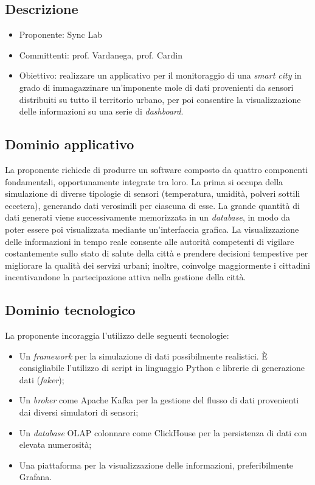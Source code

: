 \documentclass[8pt]{article}
\begin{document}
\subsection{Descrizione}
\begin{itemize}
	\setlength\itemsep{0em}
	\item Proponente: Sync Lab
	\item Committenti: prof. Vardanega, prof. Cardin
	\item Obiettivo: realizzare un applicativo per il monitoraggio di una \textit{smart city} in grado di immagazzinare un'imponente mole di dati provenienti da sensori distribuiti su tutto il territorio urbano, per poi consentire la visualizzazione delle informazioni su una serie di \textit{dashboard}.
\end{itemize}

\subsection{Dominio applicativo}
La proponente richiede di produrre un software composto da quattro componenti fondamentali, opportunamente integrate tra loro. La prima si occupa della simulazione di diverse tipologie di sensori (temperatura, umidità, polveri sottili eccetera), generando dati verosimili per ciascuna di esse. La grande quantità di dati generati viene successivamente memorizzata in un \textit{database}, in modo da poter essere poi visualizzata mediante un'interfaccia grafica. La visualizzazione delle informazioni in tempo reale consente alle autorità competenti di vigilare costantemente sullo stato di salute della città e prendere decisioni tempestive per migliorare la qualità dei servizi urbani; inoltre, coinvolge maggiormente i cittadini incentivandone la partecipazione attiva nella gestione della città.

\subsection{Dominio tecnologico}
La proponente incoraggia l'utilizzo delle seguenti tecnologie:
\begin{itemize}
	\setlength\itemsep{0em}
	\item Un \textit{framework} per la simulazione di dati possibilmente realistici. È consigliabile l'utilizzo di script in linguaggio Python e librerie di generazione dati (\textit{faker});
	\item Un \textit{broker} come Apache Kafka per la gestione del flusso di dati provenienti dai diversi simulatori di sensori;
	\item Un \textit{database} OLAP colonnare come ClickHouse per la persistenza di dati con elevata numerosità;
	\item Una piattaforma per la visualizzazione delle informazioni, preferibilmente Grafana. 
\end{itemize}
\end{document}
